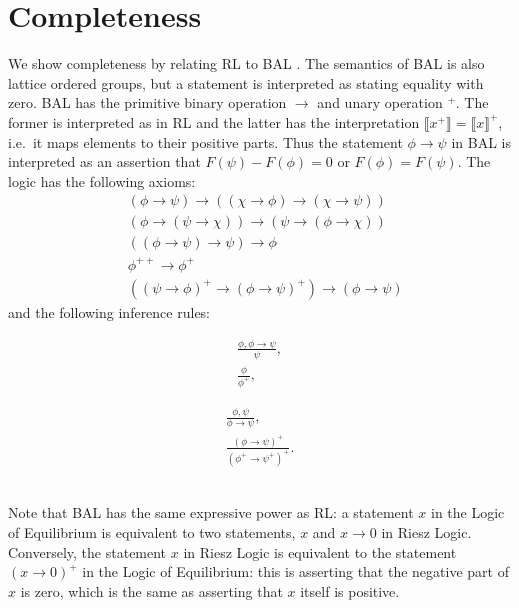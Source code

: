 \documentclass[journal]{IEEEtran}
\theoremstyle{definition}
\newcommand{\interp}[1]{\llbracket #1 \rrbracket}
\begin{document}
\section{Completeness}

We show completeness by relating RL to BAL \cite{Galli:04}. The
semantics of BAL is also lattice ordered groups, but a statement is
interpreted as stating equality with zero. BAL has the primitive
binary operation $\rightarrow$ and unary operation ${}^+$. The former
is interpreted as in RL and the latter has the interpretation
$\interp{x^+} = \interp{x}^+$, i.e.~it maps elements to their positive
parts. Thus the statement $\phi \rightarrow \psi$ in BAL is
interpreted as an assertion that $F(\psi) - F(\phi) = 0$ or $F(\phi) =
F(\psi)$. The logic has the following axioms:
\begin{align}
  \tag{BALB} &(\phi \rightarrow \psi) \rightarrow ((\chi \rightarrow \phi)
  \rightarrow (\chi \rightarrow \psi))\\
  \tag{BALC} &(\phi \rightarrow (\psi \rightarrow \chi)) \rightarrow
  (\psi \rightarrow (\phi \rightarrow \chi))\\
  \tag{BALN} &((\phi \rightarrow \psi) \rightarrow \psi) \rightarrow
  \phi\\
  \tag{BALP} &\phi^{++} \rightarrow\phi^+\\
  \tag{BALO} &((\psi\rightarrow\phi)^+
  \rightarrow(\phi\rightarrow\psi)^+)\rightarrow
  (\phi\rightarrow\psi)
\end{align}
and the following inference rules:\\
\begin{minipage}{0.49\columnwidth}
\begin{gather}
  \tag{BALMP} \frac{\phi, \phi \rightarrow \psi}{\psi},\\
  \tag{BALPI} \frac{\phi}{\phi^+},
\end{gather}
\end{minipage}
\begin{minipage}{0.49\columnwidth}
\begin{gather}
  \tag{BALG} \frac{\phi, \psi}{\phi \rightarrow \psi},\\
  \tag{BALMI} \frac{(\phi\rightarrow\psi)^+}{(\phi^+\rightarrow\psi^+)^+}.
\end{gather}
\end{minipage}
\vspace{0.3cm}\\
Note that BAL has the same expressive power as RL: a statement $x$ in
the Logic of Equilibrium is equivalent to two statements, $x$ and
$x\rightarrow 0$ in Riesz Logic. Conversely, the statement $x$ in
Riesz Logic is equivalent to the statement $(x\rightarrow 0)^+$ in the
Logic of Equilibrium: this is asserting that the negative part of $x$
is zero, which is the same as asserting that $x$ itself is positive.
\end{document}
